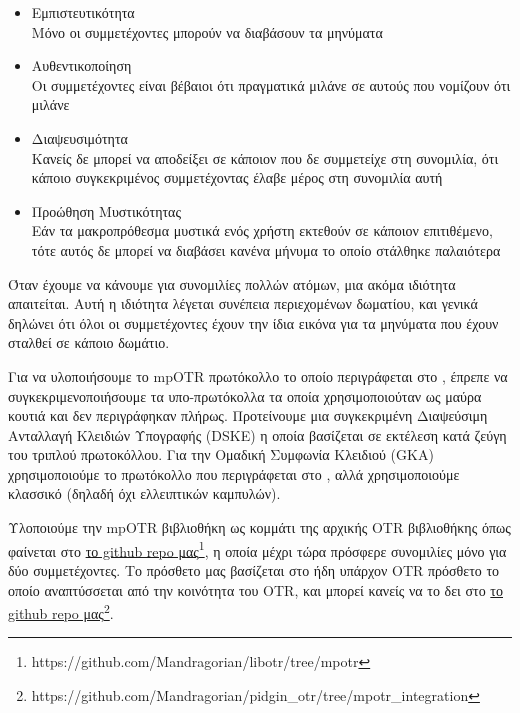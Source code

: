 \begin{itemize}
  \item Εμπιστευτικότητα\\
    Μόνο οι συμμετέχοντες μπορούν να διαβάσουν τα μηνύματα\\[0.2cm]

  \item Αυθεντικοποίηση\\
    Οι συμμετέχοντες είναι βέβαιοι ότι πραγματικά μιλάνε σε αυτούς που νομίζουν ότι μιλάνε\\[0.2cm]

  \item Διαψευσιμότητα\\
    Κανείς δε μπορεί να αποδείξει σε κάποιον που δε συμμετείχε στη συνομιλία, ότι κάποιο συγκεκριμένος συμμετέχοντας έλαβε μέρος στη συνομιλία αυτή\\[0.2cm]

  \item Προώθηση Μυστικότητας\\
    Εάν τα μακροπρόθεσμα μυστικά ενός χρήστη εκτεθούν σε κάποιον επιτιθέμενο, τότε αυτός δε μπορεί να διαβάσει κανένα μήνυμα το οποίο στάλθηκε παλαιότερα\\[0.2cm]

\end{itemize}

Όταν έχουμε να κάνουμε για συνομιλίες πολλών ατόμων, μια ακόμα ιδιότητα απαιτείται.
Αυτή η ιδιότητα λέγεται συνέπεια περιεχομένων δωματίου, και γενικά δηλώνει ότι όλοι οι συμμετέχοντες έχουν την ίδια εικόνα για τα μηνύματα που έχουν σταλθεί σε κάποιο δωμάτιο.

Για να υλοποιήσουμε το mpOTR πρωτόκολλο το οποίο περιγράφεται στο \cite{mpotr}, έπρεπε να συγκεκριμενοποιήσουμε τα υπο-πρωτόκολλα τα οποία χρησιμοποιούταν ως μαύρα κουτιά και δεν περιγράφηκαν πλήρως.
Προτείνουμε μια συγκεκριμένη Διαψεύσιμη Ανταλλαγή Κλειδιών Υπογραφής (DSKE) η οποία βασίζεται σε εκτέλεση κατά ζεύγη του τριπλού \dhname πρωτοκόλλου.
Για την Ομαδική Συμφωνία Κλειδιού (GKA) χρησιμοποιούμε το πρωτόκολλο που περιγράφεται στο \cite{mpenc}, αλλά χρησιμοποιούμε κλασσικό \dhname (δηλαδή όχι \dhname ελλειπτικών καμπυλών).

Υλοποιούμε την mpOTR βιβλιοθήκη ως κομμάτι της αρχικής OTR βιβλιοθήκης όπως φαίνεται στο \href{https://github.com/Mandragorian/libotr/tree/mpotr}{το github repo μας\footnote{https://github.com/Mandragorian/libotr/tree/mpotr}}, η οποία μέχρι τώρα πρόσφερε συνομιλίες μόνο για δύο συμμετέχοντες.
Το πρόσθετο μας βασίζεται στο ήδη υπάρχον OTR πρόσθετο το οποίο αναπτύσσεται από την κοινότητα του OTR, και μπορεί κανείς να το δει στο \href{https://github.com/Mandragorian/pidgin_otr/tree/mpotr_integration}{το github repo μας\footnote{https://github.com/Mandragorian/pidgin\_otr/tree/mpotr\_integration}}.

